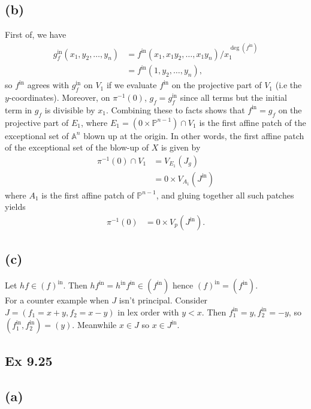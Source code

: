 \documentclass{article}
\theoremstyle{definition}
\renewcommand{\P}{\mathbb{P}}
\newcommand{\A}{\mathbb{A}}
\renewcommand{\AA}[1]{\A^{#1}}
\newcommand{\PP}[1]{\P^{#1}}
\newcommand{\ini}{\text{in}}
\begin{document}
\subsection*{(b)}

First of, we have 
\begin{align*}
	g_f^{\ini}(x_1, y_2, \ldots, y_n)
	&=
	f^{\ini}(x_1, x_1y_2, \ldots, x_1 y_n) / x_1^{\deg(f^{\ini})} \\
	&=
	f^{\ini}(1, y_2, \ldots, y_n),
\end{align*}
so $f^{\ini}$ agrees with $g_f^{\ini}$ on $V_1$ if we evaluate $f^{\ini}$ on
the projective part of $V_1$ (i.e the $y$-coordinates). Moreover, on
$\pi^{-1}(0)$, $g_f = g_f^{\ini}$ since all terms but the initial term in $g_f$
is divisible by $x_1$. Combining these to facts shows that $f^{\ini} = g_f$ on
the projective part of $E_1$, where $E_1 = ({0} \times \PP{n - 1}) \cap V_1$ is
the first affine patch of the exceptional set of $\AA{n}$ blown up at the
origin. In other words, the first affine patch of the exceptional set of the
blow-up of $X$ is given by
\begin{align*}
	\pi^{-1}(0) \cap V_1
	&= 
	V_{E_1}(J_g) \\
	&= 
	0 \times V_{A_1}(J^{\ini})
\end{align*}
where $A_1$ is the first affine patch of $\PP{n - 1}$, and gluing together all
such patches yields
\begin{align*}
	\pi^{-1}(0)
	&= 
	0 \times V_p(J^{\ini}).
\end{align*}

\subsection*{(c)}

Let $hf \in (f)^{\ini}$. Then $hf^{\ini} = h^{\ini}f^{\ini} \in (f^{\ini})$ hence
$(f)^{\ini} = (f^{\ini})$. \\

For a counter example when $J$ isn't principal. Consider $J = (f_1 = x + y, f_2
= x - y)$ in lex order with $y < x$. Then $f_1^{\ini} = y, f_2^{\ini} = -y$, so
$(f_1^{\ini}, f_2^{\ini}) = (y)$. Meanwhile $x \in J$ so $x \in J^{\ini}$.


\subsection*{Ex 9.25}

\subsection*{(a)}
\end{document}
